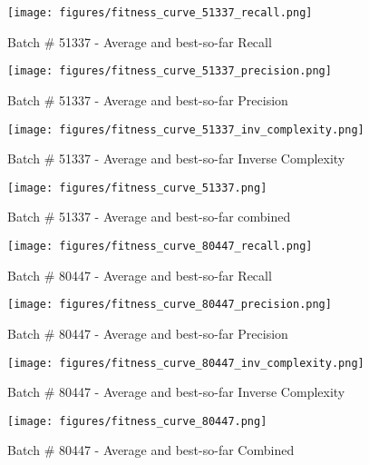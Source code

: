 \documentclass[conference]{IEEEtran}
\begin{document}
\begin{figure}[htbp]
\centering
\texttt{[image: figures/fitness\_curve\_51337\_recall.png]}
\caption{Batch \# 51337 - Average and best-so-far Recall}
\label{fig:performance-comparison}
\end{figure}

\begin{figure}[htbp]
\centering
\texttt{[image: figures/fitness\_curve\_51337\_precision.png]}
\caption{Batch \# 51337 - Average and best-so-far Precision}
\label{fig:performance-comparison}
\end{figure}

\begin{figure}[htbp]
\centering
\texttt{[image: figures/fitness\_curve\_51337\_inv\_complexity.png]}
\caption{Batch \# 51337 - Average and best-so-far Inverse Complexity}
\label{fig:performance-comparison}
\end{figure}

\begin{figure}[htbp]
\centering
\texttt{[image: figures/fitness\_curve\_51337.png]}
\caption{Batch \# 51337 - Average and best-so-far combined}
\label{fig:performance-comparison}
\end{figure}

\begin{figure}[htbp]
\centering
\texttt{[image: figures/fitness\_curve\_80447\_recall.png]}
\caption{Batch \# 80447 - Average and best-so-far Recall}
\label{fig:performance-comparison}
\end{figure}

\begin{figure}[htbp]
\centering
\texttt{[image: figures/fitness\_curve\_80447\_precision.png]}
\caption{Batch \# 80447 - Average and best-so-far Precision}
\label{fig:performance-comparison}
\end{figure}

\begin{figure}[htbp]
\centering
\texttt{[image: figures/fitness\_curve\_80447\_inv\_complexity.png]}
\caption{Batch \# 80447 - Average and best-so-far Inverse Complexity}
\label{fig:performance-comparison}
\end{figure}

\begin{figure}[htbp]
\centering
\texttt{[image: figures/fitness\_curve\_80447.png]}
\caption{Batch \# 80447 - Average and best-so-far Combined}
\label{fig:performance-comparison}
\end{figure}
\clearpage
\end{document}
